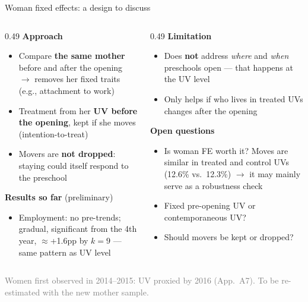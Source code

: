 \documentclass[aspectratio=169,10pt]{beamer}
\newcommand{\fuente}[1]{\vspace{2pt}\textcolor{graytext}{\scriptsize #1}}
\newcommand{\takeaway}[1]{\par\vspace{6pt}{\small\textcolor{steel}{$\Rightarrow$}\ \textbf{\textcolor{navy}{#1}}}}
\begin{document}
\begin{frame}[label=femuj]{Woman fixed effects: a design to discuss}
\begin{columns}[T]
\begin{column}{0.49\textwidth}
{\small\textcolor{steel}{\textbf{Approach}}}
\begin{itemize}
  \footnotesize
  \item Compare \textbf{the same mother} before and after the opening $\to$ removes her fixed traits (e.g., attachment to work)
  \item Treatment from her \textbf{UV before the opening}, kept if she moves (intention-to-treat)
  \item Movers are \textbf{not dropped}: staying could itself respond to the preschool
\end{itemize}
\vspace{2pt}
{\small\textcolor{steel}{\textbf{Results so far} (preliminary)}}
\begin{itemize}
  \footnotesize
  \item Employment: no pre-trends; gradual, significant from the 4th year, $\approx$+1.6pp by $k=9$ --- same pattern as UV level
\end{itemize}
\end{column}
\begin{column}{0.49\textwidth}
{\small\textcolor{steel}{\textbf{Limitation}}}
\begin{itemize}
  \footnotesize
  \item Does \textbf{not} address \emph{where} and \emph{when} preschools open --- that happens at the UV level
  \item Only helps if who lives in treated UVs changes after the opening
\end{itemize}
\vspace{4pt}
\colorbox{bgpanel}{\parbox{0.95\linewidth}{\raggedright\footnotesize
\textbf{Open questions}
\begin{itemize}
  \footnotesize
  \item Is woman FE worth it? Moves are similar in treated and control UVs (12.6\% vs.\ 12.3\%) $\to$ it may mainly serve as a robustness check
  \item Fixed pre-opening UV or contemporaneous UV?
  \item Should movers be kept or dropped?
\end{itemize}}}
\end{column}
\end{columns}
\takeaway{Same employment result following the same mothers --- input welcome on the design.}
\par\fuente{Women first observed in 2014--2015: UV proxied by 2016 (App.\ A7). To be re-estimated with the new mother sample.}
\end{frame}
\end{document}
